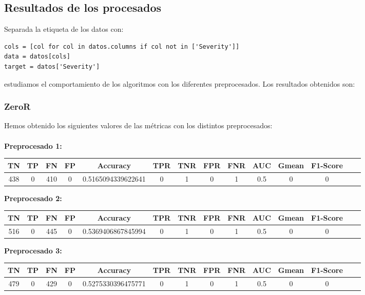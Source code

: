 \documentclass[a4]{article}
\begin{document}
\subsection{Resultados de los procesados}

Separada la etiqueta de los datos con:
  
\begin{lstlisting}
cols = [col for col in datos.columns if col not in ['Severity']]
data = datos[cols]
target = datos['Severity']
\end{lstlisting}

estudiamos el comportamiento de los algoritmos con los diferentes preprocesados. Los resultados obtenidos son:

\subsubsection{ZeroR}

Hemos obtenido los siguientes valores de las métricas con los distintos preprocesados: \\
\\

\textbf{Preprocesado 1:}
\begin{center}
\begin{tabular}{|c|c|c|c|c|c|c|c|c|c|c|c|c|c|}
\hline
\multicolumn{1}{|c|}{\textbf{TN}}& \textbf{TP} & \textbf{FN} & \textbf{FP} & \textbf{Accuracy} & \textbf{TPR} & \textbf{TNR} & \textbf{FPR} &\textbf{FNR} & \textbf{AUC} & \textbf{Gmean} & \textbf{F1-Score}  \\ \hline
  438 & 0 & 410 & 0 & 0.5165094339622641 & 0 & 1 & 0 & 1 & 0.5 & 0 & 0  \\ \hline
\end{tabular}
\end{center}

\textbf{Preprocesado 2:}
\begin{center}
\begin{tabular}{|c|c|c|c|c|c|c|c|c|c|c|c|c|c|}
\hline
\multicolumn{1}{|c|}{\textbf{TN}}& \textbf{TP} & \textbf{FN} & \textbf{FP} & \textbf{Accuracy} & \textbf{TPR} & \textbf{TNR} & \textbf{FPR} &\textbf{FNR} & \textbf{AUC} & \textbf{Gmean} & \textbf{F1-Score}  \\ \hline
  516 & 0 & 445 & 0 & 0.5369406867845994 & 0 & 1 & 0 & 1 & 0.5 & 0 & 0  \\ \hline
\end{tabular}
\end{center}

\textbf{Preprocesado 3:}
\begin{center}
\begin{tabular}{|c|c|c|c|c|c|c|c|c|c|c|c|c|c|}
\hline
\multicolumn{1}{|c|}{\textbf{TN}}& \textbf{TP} & \textbf{FN} & \textbf{FP} & \textbf{Accuracy} & \textbf{TPR} & \textbf{TNR} & \textbf{FPR} &\textbf{FNR} & \textbf{AUC} & \textbf{Gmean} & \textbf{F1-Score}  \\ \hline
  479 & 0 & 429 & 0 & 0.5275330396475771 & 0 & 1 & 0 & 1 & 0.5 & 0 & 0  \\ \hline
\end{tabular}
\end{center}
\end{document}
